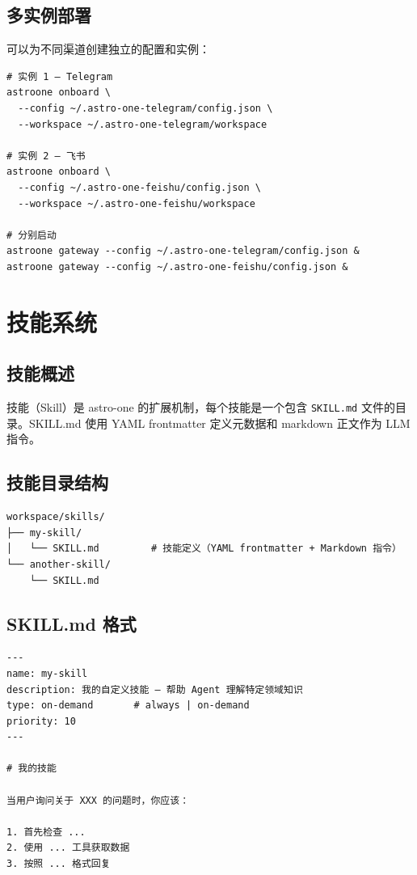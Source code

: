 \documentclass[12pt,a4paper,UTF8]{ctexart}
\begin{document}
\section{多实例部署}

可以为不同渠道创建独立的配置和实例：

\begin{verbatim}
# 实例 1 — Telegram
astroone onboard \
  --config ~/.astro-one-telegram/config.json \
  --workspace ~/.astro-one-telegram/workspace

# 实例 2 — 飞书
astroone onboard \
  --config ~/.astro-one-feishu/config.json \
  --workspace ~/.astro-one-feishu/workspace

# 分别启动
astroone gateway --config ~/.astro-one-telegram/config.json &
astroone gateway --config ~/.astro-one-feishu/config.json &
\end{verbatim}

\chapter{技能系统}

\section{技能概述}

技能（Skill）是 astro-one 的扩展机制，每个技能是一个包含 \texttt{SKILL.md} 文件的目录。SKILL.md 使用 YAML frontmatter 定义元数据和 markdown 正文作为 LLM 指令。

\section{技能目录结构}

\begin{verbatim}
workspace/skills/
├── my-skill/
│   └── SKILL.md         # 技能定义（YAML frontmatter + Markdown 指令）
└── another-skill/
    └── SKILL.md
\end{verbatim}

\section{SKILL.md 格式}

\begin{verbatim}
---
name: my-skill
description: 我的自定义技能 — 帮助 Agent 理解特定领域知识
type: on-demand       # always | on-demand
priority: 10
---

# 我的技能

当用户询问关于 XXX 的问题时，你应该：

1. 首先检查 ...
2. 使用 ... 工具获取数据
3. 按照 ... 格式回复
\end{verbatim}
\end{document}
